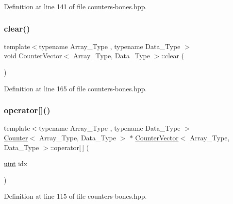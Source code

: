 Definition at line 141 of file counters-\/bones.\+hpp.

\mbox{\label{class_counter_vector_acce75748f917e3a7898d49a23df996e7}} 
\subsubsection{\texorpdfstring{clear()}{clear()}}
{\footnotesize\ttfamily template$<$typename Array\+\_\+\+Type , typename Data\+\_\+\+Type $>$ \\
void \hyperlink{class_counter_vector}{Counter\+Vector}$<$ Array\+\_\+\+Type, Data\+\_\+\+Type $>$\+::clear (\begin{DoxyParamCaption}{ }\end{DoxyParamCaption})\hspace{0.3cm}{\ttfamily [inline]}}



Definition at line 165 of file counters-\/bones.\+hpp.

\mbox{\label{class_counter_vector_a6eac3e73298e1e6d424b92f324ffe9a8}} 
\subsubsection{\texorpdfstring{operator[]()}{operator[]()}}
{\footnotesize\ttfamily template$<$typename Array\+\_\+\+Type , typename Data\+\_\+\+Type $>$ \\
\hyperlink{class_counter}{Counter}$<$ Array\+\_\+\+Type, Data\+\_\+\+Type $>$ $\ast$ \hyperlink{class_counter_vector}{Counter\+Vector}$<$ Array\+\_\+\+Type, Data\+\_\+\+Type $>$\+::operator\mbox{[}$\,$\mbox{]} (\begin{DoxyParamCaption}\item[{\hyperlink{typedefs_8hpp_a91ad9478d81a7aaf2593e8d9c3d06a14}{uint}}]{idx }\end{DoxyParamCaption})\hspace{0.3cm}{\ttfamily [inline]}}



Definition at line 115 of file counters-\/bones.\+hpp.

\mbox{\label{class_counter_vector_affee3825ee1b1ce01b926f443c67f585}} 
